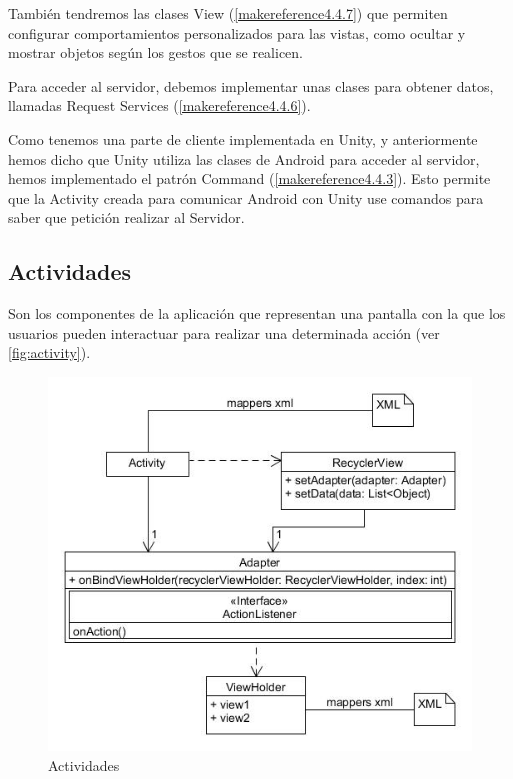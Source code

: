 También tendremos las clases View (\autoref{makereference4.4.7}) que permiten configurar comportamientos personalizados para las vistas,
como ocultar y mostrar objetos según los gestos que se realicen.

Para acceder al servidor, debemos implementar unas clases para obtener datos, llamadas Request Services (\autoref{makereference4.4.6}).

Como tenemos una parte de cliente implementada en Unity, y anteriormente hemos dicho que Unity utiliza las clases de Android para acceder al servidor,
hemos implementado el patrón Command (\autoref{makereference4.4.3}). Esto permite que 
la Activity creada para comunicar Android con Unity use comandos para saber que petición realizar al Servidor.




\subsection{Actividades}
\label{makereference4.4.1}
Son los componentes de la aplicación que representan una pantalla con la que
 los usuarios pueden interactuar para realizar una determinada
 acción (ver \autoref{fig:activity}).
\begin{figure}[H]
    \centering
    \includegraphics[width=6in]{figures/chapter-4/recyclerView.jpg}
    \caption{Actividades}
    \label{fig:activity}
\end{figure}

